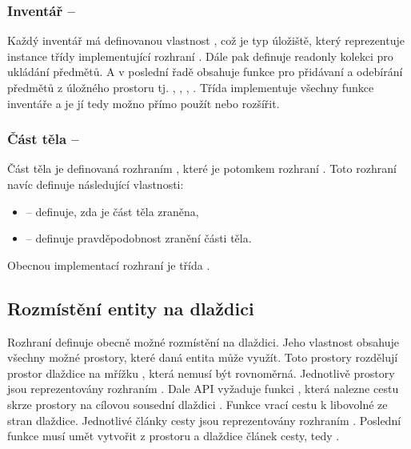 \subsubsection{Inventář -- }
Každý inventář má definovanou vlastnost , což je typ úložiště, který reprezentuje instance třídy 
implementující rozhraní . Dále pak definuje readonly kolekci  pro ukládání předmětů.
A v poslední řadě obsahuje funkce pro přidávaní a odebírání předmětů z úložného prostoru tj. , , ,
. Třída  implementuje všechny funkce inventáře a je jí tedy možno přímo použít nebo rozšířit.

\subsubsection{Část těla -- }
Část těla je definovaná rozhraním , které je potomkem rozhraní . Toto rozhraní navíc definuje 
následující vlastnosti: 
\begin{itemize}
\item {} -- definuje, zda je část těla zraněna,
\item {} -- definuje pravděpodobnost zranění části těla.
\end{itemize}

Obecnou implementací rozhraní je třída . 

\subsection{Rozmístění entity na dlaždici}\label{layout-manager-section}

Rozhraní  definuje obecně možné rozmístění na dlaždici. Jeho vlastnost  obsahuje všechny možné prostory, které daná entita může využít.
Toto prostory rozdělují prostor dlaždice na mřížku , která nemusí být rovnoměrná.
Jednotlivě prostory jsou reprezentovány rozhraním . Dale API vyžaduje funkci , která nalezne cestu skrze prostory
na cílovou sousední dlaždici . Funkce  vrací cestu k libovolné ze stran dlaždice. Jednotlivé články cesty jsou 
reprezentovány rozhraním . Poslední funkce musí umět vytvořit z prostoru a dlaždice článek cesty,
tedy .  

